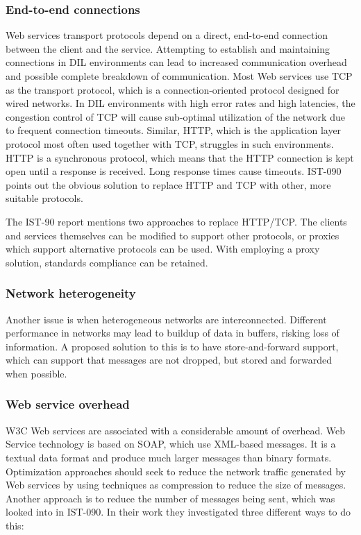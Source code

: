 \label{section:DIL-problems}

\subsubsection{End-to-end connections}

Web services transport protocols depend on a direct, end-to-end connection
between the client and the service. Attempting to establish and maintaining
connections in DIL environments can lead to increased communication overhead and
possible complete breakdown of communication. Most Web services use TCP as the
transport protocol, which is a connection-oriented protocol designed for wired
networks. In DIL environments with high error rates and high latencies, the
congestion control of TCP will cause sub-optimal utilization of the network due
to frequent connection timeouts. Similar, HTTP, which is the application layer
protocol most often used together with TCP, struggles in such environments. HTTP
is a synchronous protocol, which means that the HTTP connection is kept open
until a response is received. Long response times cause timeouts. IST-090 points
out the obvious solution to replace HTTP and TCP with other, more suitable
protocols.

The IST-90 report mentions two approaches to replace HTTP/TCP. The clients and
services themselves can be modified to support other protocols, or proxies which
support alternative protocols can be used\cite{ist-090}. With employing a proxy
solution, standards compliance can be retained.


\subsubsection{Network heterogeneity}

Another issue is when heterogeneous networks are interconnected. Different
performance in networks may lead to buildup of data in buffers, risking loss of
information. A proposed solution to this is to have store-and-forward support,
which can support that messages are not dropped, but stored and forwarded when
possible.


\subsubsection{Web service overhead}

W3C Web services are associated with a considerable amount of overhead. Web
Service technology is based on SOAP, which use XML-based messages. It is a
textual data format and produce much larger messages than binary formats.
Optimization approaches should seek to reduce the network traffic generated by
Web services by using techniques as compression to reduce the size of messages.
Another approach is to reduce the number of messages being sent, which was
looked into in IST-090\cite{ist-090}. In their work they investigated three
different ways to do this:

